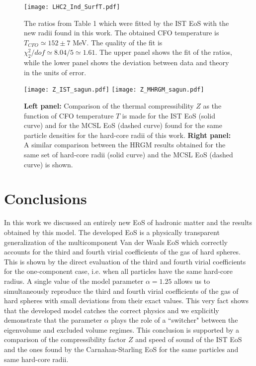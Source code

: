 \documentclass[12pt]{article}
\begin{document}
\begin{figure}
\centerline{
\texttt{[image: LHC2\_Ind\_SurfT.pdf]}
}
 \caption{The ratios from Table 1 which were fitted by the IST EoS with the new radii found in this work. 
 The obtained  CFO temperature is  $T_{CFO} \simeq 152 \pm 7$ MeV. 
 The  quality  of the fit is  $\chi^2_2/dof \simeq 8.04/5 \simeq 1.61$. The upper panel shows the fit of the ratios, while the lower panel shows the deviation between data and theory in the units of  error.}
\label{Fig8}
%
\end{figure}

%

\begin{figure}[htb]
\centerline{
\texttt{[image: Z\_IST\_sagun.pdf]}
  \hspace*{0.22cm}
\texttt{[image: Z\_MHRGM\_sagun.pdf]}
  }
 \caption{{\bf Left panel:}  Comparison of the thermal compressibility $Z$ as the function of  CFO temperature $T$ is made for the IST EoS (solid curve)  and for the MCSL EoS (dashed  curve) found for the same particle densities for the hard-core radii of this work.  {\bf Right panel:}
A similar comparison between the  HRGM results obtained for the same set of hard-core radii   (solid curve)  and the MCSL EoS (dashed curve) is  shown.  }
\label{Fig9}
\end{figure}



\section{Conclusions}

In this work we discussed an entirely new EoS of hadronic matter and the results obtained by this model. 
The developed EoS is a physically transparent generalization of the multicomponent Van der Waals EoS 
which correctly accounts for  the third and fourth virial coefficients of the gas of hard spheres.  This is shown by the direct evaluation of the third and fourth virial coefficients for the one-component case, i.e. when all particles have the same hard-core radius.  
A single value of the  model parameter $\alpha=1.25$ allows us to simultaneously reproduce the third and fourth virial coefficients of 
the gas of hard spheres  with small deviations from their exact values. This very fact   shows that the developed model catches the correct physics and we explicitly  demonstrate that  the parameter $\alpha$ plays  the role of  a ``switcher"  between the 
eigenvolume and excluded volume regimes.
This conclusion is supported by a comparison of the compressibility factor $Z$ and speed of sound of the IST EoS and the ones 
found by the Carnahan-Starling EoS \cite{CSeos}  for the same particles  and same hard-core radii.  
\end{document}
